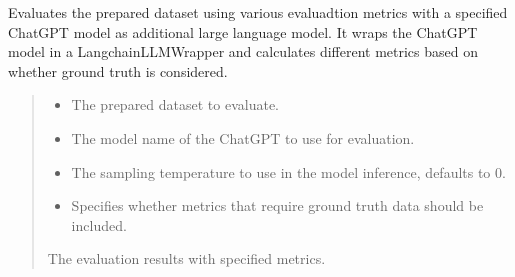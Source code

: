 \documentclass[letterpaper,10pt,english,openany,oneside]{sphinxmanual}
\begin{document}
\begin{fulllineitems}
\label{\detokenize{evaluation:tools.pipeline.ragas_evaluate_data}}
\pysigstartsignatures
{}
\pysigstopsignatures
\sphinxAtStartPar
Evaluates the prepared dataset using various evaluadtion metrics with a specified ChatGPT model as additional large language model.
It wraps the ChatGPT model in a LangchainLLMWrapper and calculates different metrics based on whether ground truth is considered.
\begin{quote}\begin{description}
\begin{itemize}
\item {} 
\sphinxAtStartPar
{} \textendash{} The prepared dataset to evaluate.

\item {} 
\sphinxAtStartPar
{} \textendash{} The model name of the ChatGPT to use for evaluation.

\item {} 
\sphinxAtStartPar
{} \textendash{} The sampling temperature to use in the model inference, defaults to 0.

\item {} 
\sphinxAtStartPar
{} \textendash{} Specifies whether metrics that require ground truth data should be included.

\end{itemize}

\sphinxAtStartPar
The evaluation results with specified metrics.

\end{description}\end{quote}

\end{fulllineitems}
\end{document}
